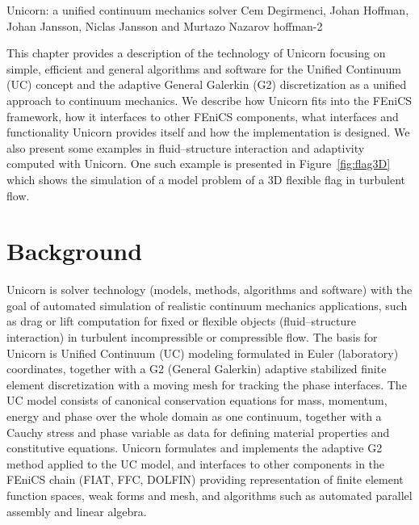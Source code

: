               {Unicorn: a unified continuum mechanics solver}
              {Cem Degirmenci, Johan Hoffman, Johan Jansson,
                Niclas Jansson and Murtazo Nazarov}
              {hoffman-2}

This chapter provides a description of the technology of Unicorn
focusing on simple, efficient and general algorithms and software for
the Unified Continuum (UC) concept and the adaptive General Galerkin
(G2) discretization as a unified approach to continuum mechanics. We
describe how Unicorn fits into the FEniCS framework, how it interfaces
to other FEniCS components, what interfaces and functionality Unicorn
provides itself and how the implementation is designed. We also
present some examples in fluid--structure interaction and adaptivity
computed with Unicorn. One such example is presented in
Figure~\ref{fig:flag3D} which shows the simulation of a model problem
of a 3D flexible flag in turbulent flow.


\section{Background}

Unicorn is solver technology (models, methods, algorithms and
software) with the goal of automated simulation of realistic continuum
mechanics applications, such as drag or lift computation for fixed or
flexible objects (fluid--structure interaction) in turbulent
incompressible or compressible flow. The basis for Unicorn is Unified
Continuum (UC) modeling \citep{HoffmanJanssonStockli2011} formulated
in Euler (laboratory) coordinates, together with a G2 (General
Galerkin) adaptive stabilized finite element discretization with a
moving mesh for tracking the phase interfaces. The UC model consists
of canonical conservation equations for mass, momentum, energy and
phase over the whole domain as one continuum, together with a Cauchy
stress and phase variable as data for defining material properties and
constitutive equations. Unicorn formulates and implements the adaptive
G2 method applied to the UC model, and interfaces to other components
in the FEniCS chain (FIAT, FFC, DOLFIN) providing representation of
finite element function spaces, weak forms and mesh, and algorithms
such as automated parallel assembly and linear algebra.

